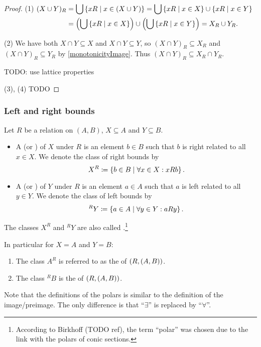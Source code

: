 \begin{proof}\mbox{}

(1) $\begin{aligned}[t]
(X\cup Y)_R &= \bigcup \left\{ xR \;\middle|\; x\in (X\cup Y) \right\} = \bigcup \left\{ xR \;\middle|\; x\in X \right\}\cup \left\{ xR \;\middle|\; x\in Y \right\} \\
&= \left(\bigcup \left\{ xR \;\middle|\; x\in X \right\}\right)\cup \left(\bigcup \left\{ xR \;\middle|\; x\in Y \right\}\right) = X_R \cup Y_R.
\end{aligned}$

(2) We have both $X\cap Y \subseteq X$ and $X\cap Y \subseteq Y$, so $(X\cap Y)_R \subseteq X_R$ and $(X\cap Y)_R \subseteq Y_R$ by \ref{monotonicityImage}. Thus $(X\cap Y)_R \subseteq X_R\cap Y_R$.

TODO: use lattice properties

(3), (4) TODO
\end{proof}


\subsubsection{Left and right bounds}
\begin{definition}
Let $R$ be a relation on $(A, B)$, $X\subseteq A$ and $Y\subseteq B$.
\begin{itemize}
\item A  (or ) of $X$ under $R$ is an element $b\in B$ such that $b$ is right related to all $x\in X$. We denote the class of right bounds by
\[ X^R \coloneqq \left\{ b\in B \;\middle|\; \forall x\in X: xRb \right\}. \]
\item A  (or ) of $Y$ under $R$ is an element $a\in A$ such that $a$ is left related to all $y\in Y$. We denote the class of left bounds by
\[ ^RY \coloneqq \left\{ a\in A \;\middle|\; \forall y\in Y: aRy \right\}. \]
\end{itemize}
The classes $X^R$ and $^RY$ are also called .\footnote{According to Birkhoff (TODO ref), the term ``polar'' was chosen due to the link with the polars of conic sections.}

In particular for $X=A$ and $Y=B$:
\begin{enumerate}
\item The class $A^R$ is referred to as the  of $\left( R,(A,B) \right)$.
\item The class $^RB$ is the  of $\left( R,(A,B) \right)$.
\end{enumerate}
\end{definition}
Note that the definitions of the polars is similar to the definition of the image/preimage. The only difference is that ``$\exists$'' is replaced by ``$\forall$''.

